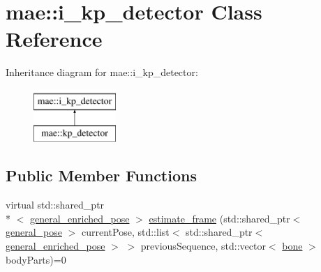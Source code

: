 \hypertarget{classmae_1_1i__kp__detector}{\section{mae\-:\-:i\-\_\-kp\-\_\-detector Class Reference}
\label{classmae_1_1i__kp__detector}
}
Inheritance diagram for mae\-:\-:i\-\_\-kp\-\_\-detector\-:\begin{figure}[H]
\begin{center}
\leavevmode
\includegraphics[height=2.000000cm]{classmae_1_1i__kp__detector}
\end{center}
\end{figure}
\subsection*{Public Member Functions}
\begin{DoxyCompactItemize}
\item 
virtual std\-::shared\-\_\-ptr\\*
$<$ \hyperlink{classmae_1_1general__enriched__pose}{general\-\_\-enriched\-\_\-pose} $>$ \hyperlink{classmae_1_1i__kp__detector_a023a2719cd16be679c1101a9c27d21ac}{estimate\-\_\-frame} (std\-::shared\-\_\-ptr$<$ \hyperlink{classmae_1_1general__pose}{general\-\_\-pose} $>$ current\-Pose, std\-::list$<$ std\-::shared\-\_\-ptr$<$ \hyperlink{classmae_1_1general__enriched__pose}{general\-\_\-enriched\-\_\-pose} $>$ $>$ previous\-Sequence, std\-::vector$<$ \hyperlink{classmae_1_1bone}{bone} $>$ body\-Parts)=0
\end{DoxyCompactItemize}


